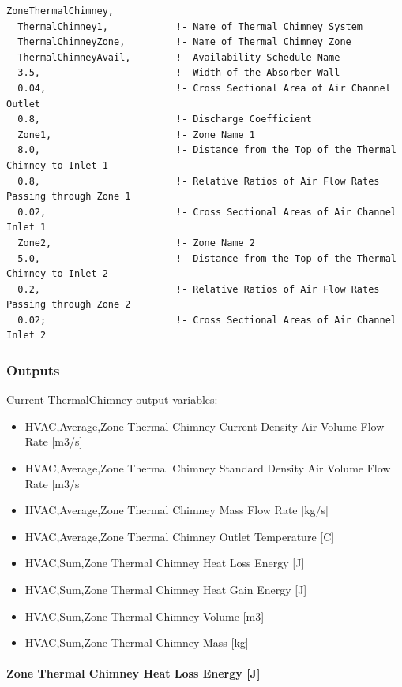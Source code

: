 \begin{lstlisting}
ZoneThermalChimney,
  ThermalChimney1,            !- Name of Thermal Chimney System
  ThermalChimneyZone,         !- Name of Thermal Chimney Zone
  ThermalChimneyAvail,        !- Availability Schedule Name
  3.5,                        !- Width of the Absorber Wall
  0.04,                       !- Cross Sectional Area of Air Channel Outlet
  0.8,                        !- Discharge Coefficient
  Zone1,                      !- Zone Name 1
  8.0,                        !- Distance from the Top of the Thermal Chimney to Inlet 1
  0.8,                        !- Relative Ratios of Air Flow Rates Passing through Zone 1
  0.02,                       !- Cross Sectional Areas of Air Channel Inlet 1
  Zone2,                      !- Zone Name 2
  5.0,                        !- Distance from the Top of the Thermal Chimney to Inlet 2
  0.2,                        !- Relative Ratios of Air Flow Rates Passing through Zone 2
  0.02;                       !- Cross Sectional Areas of Air Channel Inlet 2
\end{lstlisting}

\subsubsection{Outputs}\label{zonethermalchimney-outputs}

Current ThermalChimney output variables:

\begin{itemize}
\item
  HVAC,Average,Zone Thermal Chimney Current Density Air Volume Flow Rate {[}m3/s{]}
\item
  HVAC,Average,Zone Thermal Chimney Standard Density Air Volume Flow Rate {[}m3/s{]}
\item
  HVAC,Average,Zone Thermal Chimney Mass Flow Rate {[}kg/s{]}
\item
  HVAC,Average,Zone Thermal Chimney Outlet Temperature {[}C{]}
\item
  HVAC,Sum,Zone Thermal Chimney Heat Loss Energy {[}J{]}
\item
  HVAC,Sum,Zone Thermal Chimney Heat Gain Energy {[}J{]}
\item
  HVAC,Sum,Zone Thermal Chimney Volume {[}m3{]}
\item
  HVAC,Sum,Zone Thermal Chimney Mass {[}kg{]}
\end{itemize}

\paragraph{Zone Thermal Chimney Heat Loss Energy {[}J{]}}\label{zone-thermal-chimney-heat-loss-energy-j}


